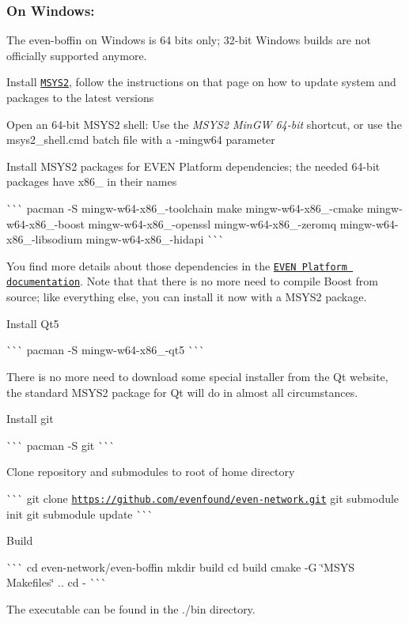 \subsubsection*{On Windows\+:}

The even-\/boffin on Windows is 64 bits only; 32-\/bit Windows builds are not officially supported anymore.


\begin{DoxyEnumerate}
\item Install \href{https://www.msys2.org/}{\tt M\+S\+Y\+S2}, follow the instructions on that page on how to update system and packages to the latest versions
\item Open an 64-\/bit M\+S\+Y\+S2 shell\+: Use the {\itshape M\+S\+Y\+S2 Min\+GW 64-\/bit} shortcut, or use the {\ttfamily msys2\+\_\+shell.\+cmd} batch file with a {\ttfamily -\/mingw64} parameter
\item Install M\+S\+Y\+S2 packages for E\+V\+EN Platform dependencies; the needed 64-\/bit packages have {\ttfamily x86\+\_} in their names

\`{}\`{}\`{} pacman -\/S mingw-\/w64-\/x86\+\_-\/toolchain make mingw-\/w64-\/x86\+\_-\/cmake mingw-\/w64-\/x86\+\_-\/boost mingw-\/w64-\/x86\+\_-\/openssl mingw-\/w64-\/x86\+\_-\/zeromq mingw-\/w64-\/x86\+\_-\/libsodium mingw-\/w64-\/x86\+\_-\/hidapi \`{}\`{}\`{}

You find more details about those dependencies in the \href{https://github.com/evenfound/even-network/doc}{\tt E\+V\+EN Platform documentation}. Note that that there is no more need to compile Boost from source; like everything else, you can install it now with a M\+S\+Y\+S2 package.
\item Install Qt5

\`{}\`{}\`{} pacman -\/S mingw-\/w64-\/x86\+\_-\/qt5 \`{}\`{}\`{}

There is no more need to download some special installer from the Qt website, the standard M\+S\+Y\+S2 package for Qt will do in almost all circumstances.
\item Install git

\`{}\`{}\`{} pacman -\/S git \`{}\`{}\`{}
\item Clone repository and submodules to root of home directory

\`{}\`{}\`{} git clone \href{https://github.com/evenfound/even-network.git}{\tt https\+://github.\+com/evenfound/even-\/network.\+git} git submodule init git submodule update \`{}\`{}\`{}
\item Build

\`{}\`{}\`{} cd even-\/network/even-\/boffin mkdir build cd build cmake -\/G \char`\"{}\+M\+S\+Y\+S Makefiles\char`\"{} .. cd -\/ \`{}\`{}\`{}
\end{DoxyEnumerate}

The executable can be found in the {\ttfamily ./bin} directory. 